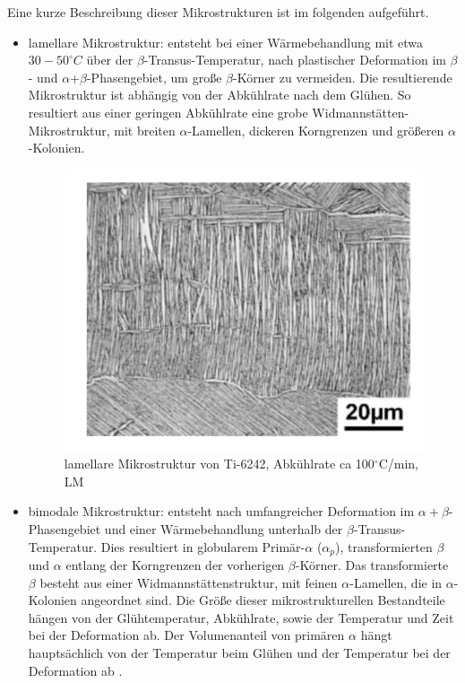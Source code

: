 Eine kurze Beschreibung dieser Mikrostrukturen ist im folgenden aufgeführt.

\begin{itemize} 
	\item lamellare Mikrostruktur: entsteht bei einer Wärmebehandlung mit etwa $30-50 ^\circ C$ über der $\beta$-Transus-Temperatur, nach plastischer Deformation im $\beta$- und $\alpha$+$\beta$-Phasengebiet, um große $\beta$-Körner zu vermeiden. Die resultierende Mikrostruktur ist abhängig von der Abkühlrate nach dem Glühen. So resultiert aus einer geringen Abkühlrate eine grobe Widmannstätten-Mikrostruktur, mit breiten $\alpha$-Lamellen, dickeren Korngrenzen und größeren $\alpha$-Kolonien. 

\begin{figure}[h]
	\centering
	\includegraphics[width=0.7\linewidth]{./Bilder/Abbildung 3.png}
	\caption[Abbildung 3]{lamellare Mikrostruktur von Ti-6242, Abkühlrate ca 100$^\circ$C/min, LM \cite{Lutjering.2007}}
	\label{fig:abbildung-3}
\end{figure}

\pagebreak

\item bimodale Mikrostruktur: entsteht nach umfangreicher Deformation im $\alpha+\beta$-Phasengebiet und einer Wärmebehandlung unterhalb der $\beta$-Transus-Temperatur. Dies resultiert in globularem Primär-$\alpha$ ($\alpha_p$), transformierten $\beta$ und $\alpha$ entlang der Korngrenzen der vorherigen $\beta$-Körner. Das transformierte $\beta$ besteht aus einer Widmannstättenstruktur, mit feinen $\alpha$-Lamellen, die in $\alpha$-Kolonien angeordnet sind. Die Größe dieser mikrostrukturellen Bestandteile hängen von der Glühtemperatur, Abkühlrate, sowie der Temperatur und Zeit bei der Deformation ab. Der Volumenanteil von primären $\alpha$ hängt hauptsächlich von der Temperatur beim Glühen und der Temperatur bei der Deformation ab \cite{Lutjering.2007}.


\end{itemize}
